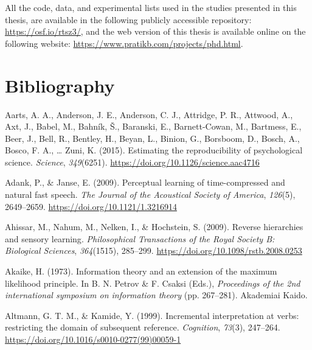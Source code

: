 \documentclass[a4paper, nobind]{templates/ociamthesis}
\newlength{\cslhangindent}
\newenvironment{CSLReferences}[2] %
 {%
  \setlength{\parindent}{0pt}
  \ifodd #1
  \let\oldpar\par
  \def\par{\hangindent=\cslhangindent\oldpar}
  \fi
  \setlength{\parskip}{1mm}
  \setlength{\baselineskip}{6mm}
 }%
 {}
\begin{document}
All the code, data, and experimental lists used in the studies presented in this thesis, are available in the following publicly accessible repository: \url{https://osf.io/rtsz3/},
and the web version of this thesis is available online on the following website:
\url{https://www.pratikb.com/projects/phd.html}.

\hypertarget{bibliography}{%
\chapter*{Bibliography}\label{bibliography}}

\hypertarget{refs}{}
\begin{CSLReferences}{1}{0}
\leavevmode{}%
Aarts, A. A., Anderson, J. E., Anderson, C. J., Attridge, P. R., Attwood, A., Axt, J., Babel, M., Bahník, Š., Baranski, E., Barnett-Cowan, M., Bartmess, E., Beer, J., Bell, R., Bentley, H., Beyan, L., Binion, G., Borsboom, D., Bosch, A., Bosco, F. A., \ldots{} Zuni, K. (2015). {Estimating the reproducibility of psychological science}. \emph{Science}, \emph{349}(6251). \url{https://doi.org/10.1126/science.aac4716}

\leavevmode{}%
Adank, P., \& Janse, E. (2009). {Perceptual learning of time-compressed and natural fast speech}. \emph{The Journal of the Acoustical Society of America}, \emph{126}(5), 2649--2659. \url{https://doi.org/10.1121/1.3216914}

\leavevmode{}%
Ahissar, M., Nahum, M., Nelken, I., \& Hochstein, S. (2009). {Reverse hierarchies and sensory learning}. \emph{Philosophical Transactions of the Royal Society B: Biological Sciences}, \emph{364}(1515), 285--299. \url{https://doi.org/10.1098/rstb.2008.0253}

\leavevmode{}%
Akaike, H. (1973). Information theory and an extension of the maximum likelihood principle. In B. N. Petrov \& F. Csaksi (Eds.), \emph{Proceedings of the 2nd international symposium on information theory} (pp. 267--281). Akademiai Kaido.

\leavevmode{}%
Altmann, G. T. M., \& Kamide, Y. (1999). Incremental interpretation at verbs: restricting the domain of subsequent reference. \emph{Cognition}, \emph{73}(3), 247--264. \url{https://doi.org/10.1016/s0010-0277(99)00059-1}


\end{CSLReferences}
\end{document}

